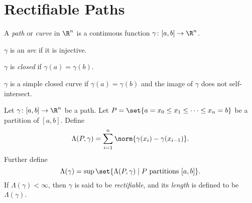 \section{Rectifiable Paths} \label{sec:rectifiable_paths}
\begin{definition}[Path] \label{def:path}
    A \emph{path} or \emph{curve} in $\R^n$ is a continuous function
    $\gamma\colon [a, b] \to \R^n$.

    $\gamma$ is an \emph{arc} if it is injective.

    $\gamma$ is \emph{closed} if $\gamma(a) = \gamma(b)$.

    $\gamma$ is a simple closed curve if $\gamma(a) = \gamma(b)$ and the
    image of $\gamma$ does not self-intersect.
\end{definition}

\begin{definition} \label{def:path:length}
    Let $\gamma\colon [a, b] \to \R^n$ be a path.
    Let $P = \set{a = x_0 \le x_1 \le \dots \le x_n = b}$ be a partition
    of $[a, b]$.
    Define \[
        \Lambda(P, \gamma)
            = \sum_{i=1}^n \norm{\gamma(x_i) - \gamma(x_{i-1})}.
    \] Further define \[
        \Lambda(\gamma)
        = \sup\set{\Lambda(P, \gamma) \mid P \text{ partitions } [a, b]}.
    \] If $\Lambda(\gamma) < \infty$, then $\gamma$ is said to be
    \emph{rectifiable}, and its \emph{length} is defined to be
    $\Lambda(\gamma)$.
\end{definition}

